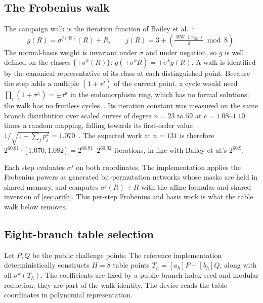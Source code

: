 \documentclass[11pt,a4paper]{article}
\newcommand{\HW}{\operatorname{HW}}
\begin{document}
\subsection{The Frobenius walk}\label{sec:sigmawalk}
The campaign walk is the iteration function of Bailey et al.~\cite{bailey2009}:
\begin{equation}\label{eq:sigmawalk}
 g(R)=\sigma^{j(R)}(R)+R,\qquad j(R)=3+\left(\tfrac{\HW(x_{\mathrm{NB}})}{2}\bmod 8\right).
\end{equation}
The normal-basis weight is invariant under $\sigma$ and under negation, so $g$ is well defined on the classes $\{\pm\sigma^k(R)\}$: $g(\pm\sigma^k R)=\pm\sigma^k g(R)$. A walk is identified by the canonical representative of its class at each distinguished point. Because the step adds a multiple $(1+\tau^{j})$ of the current point, a cycle would need $\prod_i(1+\tau^{j_i})=\pm\tau^a$ in the endomorphism ring, which has no formal solutions; the walk has no fruitless cycles~\cite{walkconstant}. Its iteration constant was measured on the same branch distribution over scaled curves of degree $n=23$ to $59$ at $c=1.08$--$1.10$ times a random mapping, falling towards its first-order value $1/\sqrt{1-\sum_jp_j^2}=1.070$~\cite{walkconstant}. The expected work at $n=131$ is therefore $2^{60.81}\cdot[1.070,1.082]=2^{60.91}$--$2^{60.92}$ iterations, in line with Bailey et al.'s $2^{60.9}$.

Each step evaluates $\sigma^j$ on both coordinates. The implementation applies the Frobenius powers as generated bit-permutation networks whose masks are held in shared memory, and computes $\sigma^j(R)+R$ with the affine formulas and shared inversion of \cref{sec:arith}. This per-step Frobenius and basis work is what the table walk below removes.

\subsection{Eight-branch table selection}\label{sec:table}
Let $P,Q$ be the public challenge points. The reference implementation deterministically constructs $H=8$ table points $T_h=[a_h]P+[b_h]Q$, along with all $\sigma^k(T_h)$. The coefficients are fixed by a public branch-index seed and modular reduction; they are part of the walk identity. The device reads the table coordinates in polynomial representation.
\end{document}
